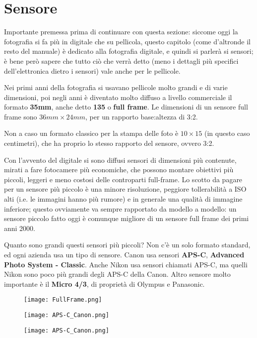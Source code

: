 \section{Sensore} \label{sec:sensore}
Importante premessa prima di continuare con questa sezione: siccome oggi la fotografia si fa più in digitale che su pellicola, questo capitolo (come d'altronde il resto del manuale) è dedicato alla fotografia digitale, e quindi si parlerà si sensori; è bene però sapere che tutto ciò che verrà detto (meno i dettagli più specifici dell'elettronica dietro i sensori) vale anche per le pellicole.

Nei primi anni della fotografia si usavano pellicole molto grandi e di varie dimensioni, poi negli anni è diventato molto diffuso a livello commerciale il formato \textbf{35mm}, anche detto \textbf{135} o \textbf{full frame}.
Le dimensioni di un sensore full frame sono $36mm \times 24mm$, per un rapporto base:altezza di 3:2.

Non a caso un formato classico per la stampa delle foto è $10 \times 15$ (in questo caso centimetri), che ha proprio lo stesso rapporto del sensore, ovvero 3:2.

Con l'avvento del digitale si sono diffusi sensori di dimensioni più contenute, mirati a fare fotocamere più economiche, che possono montare obiettivi più piccoli, leggeri e meno costosi delle controparti full-frame.
Lo scotto da pagare per un sensore più piccolo è una minore risoluzione, peggiore tollerabilità a ISO alti (i.e. le immagini hanno più rumore) e in generale una qualità di immagine inferiore; questo ovviamente va sempre rapportato da modello a modello: un sensore piccolo fatto oggi è comunque migliore di un sensore full frame dei primi anni 2000.

Quanto sono grandi questi sensori più piccoli? Non c'è un solo formato standard, ed ogni azienda usa un tipo di sensore.\newline
Canon usa sensori \textbf{APS-C}, \textbf{Advanced Photo System - Classic}. Anche Nikon usa sensori chiamati APS-C, ma quelli Nikon sono poco più grandi degli APS-C della Canon. Altro sensore molto importante è il \textbf{Micro 4/3}, di proprietà di Olympus e Panasonic.

\begin{multicols}{3}
    \begin{figure}
        \texttt{[image: FullFrame.png]}
    \end{figure}

    \columnbreak

    \begin{figure}
        \texttt{[image: APS-C\_Canon.png]}
    \end{figure}

    \columnbreak

    \begin{figure}
        \texttt{[image: APS-C\_Canon.png]}
    \end{figure}
\end{multicols}

